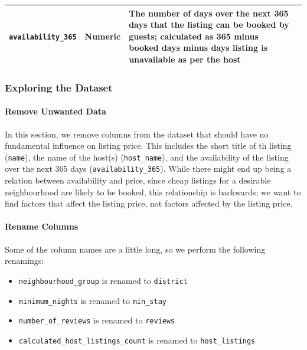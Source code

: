 \documentclass[]{article}
\let\oldparagraph\paragraph
\renewcommand{\paragraph}[1]{\oldparagraph{#1}\mbox{}}
\begin{document}
\begin{longtable}[]{@{}llll@{}}
\begin{minipage}[t]{0.22\columnwidth}
\texttt{availability\_365}\strut
\end{minipage} & \begin{minipage}[t]{0.22\columnwidth}\raggedright
Numeric\strut
\end{minipage} & \begin{minipage}[t]{0.22\columnwidth}\raggedright
The number of days over the next 365 days that the listing can be booked
by guests; calculated as 365 minus booked days minus days listing is
unavailable as per the host\strut
\end{minipage}\tabularnewline
\bottomrule
\end{longtable}

\hypertarget{exploring-the-dataset}{%
\subsubsection{Exploring the Dataset}\label{exploring-the-dataset}}

\hypertarget{remove-unwanted-data}{%
\paragraph{Remove Unwanted Data}\label{remove-unwanted-data}}

In this section, we remove columns from the dataset that should have no
fundamental influence on listing price. This includes the short title of
th listing (\texttt{name}), the name of the host(s)
(\texttt{host\_name}), and the availability of the listing over the next
365 days (\texttt{availability\_365}). While there might end up being a
relation between availability and price, since cheap listings for a
desirable neighbourhood are likely to be booked, this relationship is
backwards; we want to find factors that affect the listing price, not
factors affected by the listing price.

\hypertarget{rename-columns}{%
\paragraph{Rename Columns}\label{rename-columns}}

Some of the column names are a little long, so we perform the following
renamings:

\begin{itemize}
\item
  \texttt{neighbourhood\_group} is renamed to \texttt{district}
\item
  \texttt{minimum\_nights} is renamed to \texttt{min\_stay}
\item
  \texttt{number\_of\_reviews} is renamed to \texttt{reviews}
\item
  \texttt{calculated\_host\_listings\_count} is renamed to
  \texttt{host\_listings}
\end{itemize}
\end{document}
